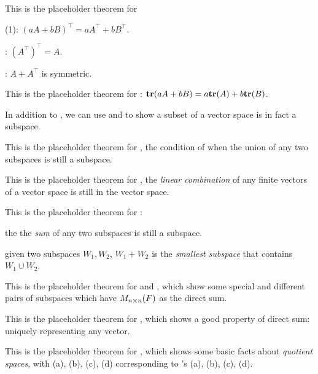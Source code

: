 \begin{additional theorem} \label{athm 1.2}
This is the placeholder theorem for

 (1): \((aA + bB)^\top = aA^\top + bB^\top\).

 : \((A^\top)^\top = A\).

 : \(A + A^\top\) is symmetric.
\end{additional theorem}

\begin{additional theorem} \label{athm 1.3}
This is the placeholder theorem for : \(\textbf{tr}(aA + bB) = a \textbf{tr}(A) + b \textbf{tr}(B)\).
\end{additional theorem}

\begin{additional theorem} \label{athm 1.4}
In addition to , we can use  and  to show a subset of a vector space is in fact a subspace.
\end{additional theorem}

\begin{additional theorem} \label{athm 1.5}
This is the placeholder theorem for , the condition of when the union of any two subspaces is still a subspace.
\end{additional theorem}

\begin{additional theorem} \label{athm 1.6}
This is the placeholder theorem for , the \emph{linear combination} of any finite vectors of a vector space is still in the vector space.
\end{additional theorem}

\begin{additional theorem} \label{athm 1.7}
This is the placeholder theorem for :

 the the \emph{sum} of any two subspaces is still a subspace.

 given two subspaces \(W_1, W_2\), \(W_1 + W_2\) is the \emph{smallest subspace} that contains \(W_1 \cup W_2\).
\end{additional theorem}

\begin{additional theorem} \label{athm 1.8}
This is the placeholder theorem for  and , which show some special and different pairs of subspaces which have \(M_{n \times n}(F)\) as the direct sum.
\end{additional theorem}

\begin{additional theorem} \label{athm 1.9}
This is the placeholder theorem for , which shows a good property of direct sum: uniquely representing any vector.
\end{additional theorem}

\begin{additional theorem} \label{athm 1.10}
This is the placeholder theorem for , which shows some basic facts about \emph{quotient spaces}, with (a), (b), (c), (d) corresponding to 's (a), (b), (c), (d).
\end{additional theorem}
